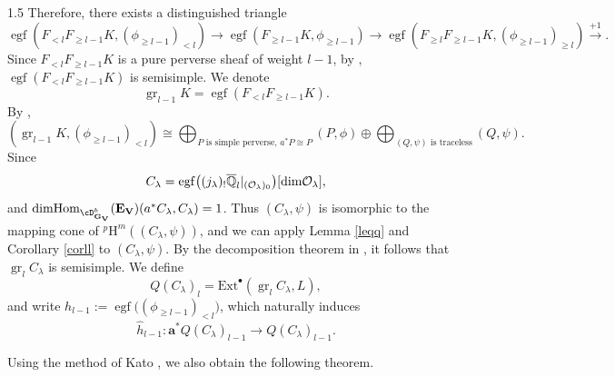 \documentclass[10pt]{amsart}
\def\Hom{\mbox{\rm Hom}}  \def\ap{\mbox{\rm ap}}
\def\dim{\mbox{\rm dim}}   \def\End{\mbox{\rm End}}
\def\bfV{{\mathbf V}}
\def\bfV{\mathbf{V}}
\def\bfE{\mathbf{E}}
\def\bfG{\mathbf{G}}
\begin{document}
\begin{spacing}{1.5}
Therefore, there exists a distinguished triangle
\[
\operatorname{egf}(F_{<l} F_{\geq l-1} K, (\phi_{\geq l-1})_{<l}) \to \operatorname{egf}(F_{\geq l-1} K, \phi_{\geq l-1}) \to \operatorname{egf}(F_{\geq l} F_{\geq l-1} K, (\phi_{\geq l-1})_{\geq l}) \xrightarrow{+1}.
\]
Since $F_{<l} F_{\geq l-1} K$ is a pure perverse sheaf of weight $l-1$, by \cite[Theorem 5.4.5]{BBD}, $\operatorname{egf}(F_{<l} F_{\geq l-1} K)$ is semisimple. We denote
\[
\operatorname{gr}_{l-1} K = \operatorname{egf}(F_{<l} F_{\geq l-1} K).
\]
By \cite[11.1.3]{lusztig2010introduction},
\[
(\operatorname{gr}_{l-1} K ,(\phi_{\geq l-1})_{<l})\cong \bigoplus_{P\text{ is simple perverse, }a^*P\cong P}(P,\phi)\oplus \bigoplus_{(Q,\psi)\text{ is traceless}}(Q,\psi).
\]
Since
\[
C_{\lambda} = \operatorname{egf}\bigl((j_{\lambda})_! \overline{\mathbb{Q}}_l |_{(\mathcal{O}_{\lambda})_0}\bigr)[\dim \mathcal{O}_{\lambda}],
\]
and $\dim\Hom_{\cD^b_{\bfG_{\bfV}}}(\bfE_{\bfV})(a^*C_{\lambda},C_{\lambda})=1$. Thus $(C_{\lambda},\psi)$ is isomorphic to the mapping cone of ${}^p\mathrm{H}^m((C_{\lambda},\psi))$, and we can apply Lemma \ref{leqq} and Corollary \ref{corll} to $(C_{\lambda},\psi)$.
By the decomposition theorem in \cite{BBD}, it follows that $\operatorname{gr}_l C_{\lambda}$ is semisimple. We define
\[
Q(C_{\lambda})_l = \mathrm{Ext}^{\bullet}(\operatorname{gr}_l C_{\lambda}, L),
\]
and write $h_{l-1} := \operatorname{egf}\bigl((\phi_{\geq l-1})_{<l}\bigr)$, which naturally induces
\[
\hat{h}_{l-1} : \mathbf{a}^* Q(C_{\lambda})_{l-1} \to Q(C_{\lambda})_{l-1}.
\]

Using the method of Kato \cite{cd088214-009e-3813-9a86-97f9a299a24c}, we also obtain the following theorem.


\end{spacing}
\end{document}
